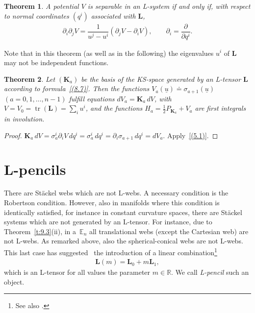 \documentclass[10pt,a4paper]{amsart}
\def\bs{\boldsymbol}
\numberwithin{equation}{section}
\newtheorem{Theorem}{Theorem}[section]
 { \theoremstyle{definition}
\newtheorem{Notation}[Theorem]{Notation}
\newtheorem{Example}[Theorem]{Example}
\newtheorem{Remark}[Theorem]{Remark}
\newtheorem{Remarks}[Theorem]{Remarks}
 }
\begin{document}
\begin{Theorem}
A potential $V$ is separable in an L-system if and only if, with respect to  normal coordinates $(q^i)$ associated with $\bs L$,
\begin{gather*}
\partial_i\partial_jV=\dfrac 1{u^j-u^i} (\partial_jV-\partial_iV),\qquad  \partial_i=\dfrac{ \partial}{\partial q^i}.
\end{gather*}
\end{Theorem}

Note that in this theorem (as well as in the following) the eigenvalues $u^i$ of $\bs L$ may not be independent functions.

\begin{Theorem}
Let $(\bs K_a)$ be the basis of the KS-space generated by an L-tensor $\bs L$ according to formula~\eqref{(8.7)}. Then the functions $V_a(\underline u)\doteq \sigma_{a+1}(\underline u)$ $(a=0,1,\ldots, n-1)$ fulfill equations
$dV_a=\bs K_a\,dV$, with $V=V_0=\operatorname{tr}(\bs L)=\sum_iu^i$, and
the functions $H_a=\tfrac 12 P_{\bs K_a}+V_a$ are first integrals in involution.
\end{Theorem}

\begin{proof}
$\bs K_a\,dV=\sigma_a^i \partial_iV\,dq^i=\sigma_a^i\,dq^i=\partial_i\sigma_{a+1}\,dq^i=dV_a$. Apply~\eqref{(5.1)}.
\end{proof}



\section{L-pencils}\label{section11}

There are St\"ackel webs which are not L-webs. A necessary condition is the Robertson condition. However, also in manifolds where this condition is identically satisf\/ied, for instance in constant curvature spaces, there are St\"ackel systems which are not generated by an L-tensor. For instance, due to Theorem~\ref{t:9.3}(ii), in a~$\mathbb E_n$ all translational webs (except the Cartesian web) are not L-webs. As remarked above, also the spherical-conical webs are not L-webs. This last case has suggested~\cite{Benenti-1992b} the introduction of a linear combination\footnote{See also \cite{Benenti-2008}.\label{pagenote3}}
\begin{gather*}
\bs L(m)=\bs L_0+m\bs L_1,
\end{gather*}
which is an L-tensor for all values the parameter $m\in \mathbb R$. We call {\it L-pencil} such an object.
\end{document}
